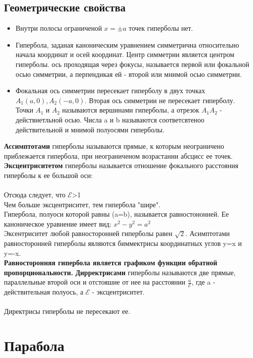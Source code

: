 \documentclass{book}
\begin{document}
\subsection{Геометрические свойства}
\begin{itemize}
    \item Внутри полосы ограниченой $x=\pm a$ точек гиперболы нет. 
    \item Гипербола, заданая каноническим уравнением симметрична относительно начала координат и осей координат. Центр симметрии является центром гиперболы. ось проходящая через фокусы, называется первой или фокальной осью симметрии, а перпендикая ей - второй или мнимой осью симметрии.
    \item Фокальная ось симметрии пересекает гиперболу в двух точках $A_1(a,0), A_2(-a,0)$. Вторая ось симметрии не пересекает гиперболу. Точки $A_1$ и $A_2$ называются вершинами гиперболы, а отрезок $A_1A_2$ -  действиетльной осью. Числа a и b называются соответсвтеноо действительной и мнимой полуосями гиперболы.
\end{itemize}
\textbf{Ассимптотами} гиперболы называются прямые, к которым неограничено приблежается гипербола, при неограниченом возрастании абсцисс ее точек.\\
\textbf{Эксцентриситетом} гиперболы называется отношение фокального расстояния гиперболы к ее большой оси:\\
\\
Отсюда следует, что $\mathcal{E}$>1\\
Чем больше эксцентриситет, тем гипербола "шире".\\
Гипербола, полуоси которой равны (a=b), называется равностононней. Ее каноническое уравнение имеет вид: $x^2-y^2=a^2$\\
Эксентриситет любой равносторонней гиперболы равен $\sqrt{2}$. Асимптотами равносторонней гиперболы являются биммектрисы координатных углов y=x и y=-x.\\
\textbf{Равносторонняя гипербола является графиком функции обратной пропорциональности.}
\textbf{Дирректрисами} гиперболы называются две прямые, параллельные второй оси и отстояшие от нее на расстоянии $\frac{a}{\mathcal{E}}$, где a - действительная полуось, а $\mathcal{E}$ - эксцентриситет.\\
\\
Директрисы гиперболы не пересекают ее.
\section{Парабола}
\end{document}
